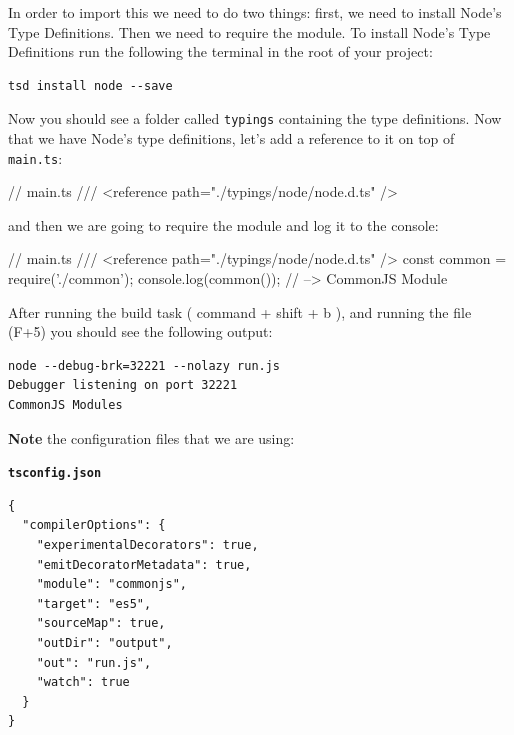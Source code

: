 \documentclass[12pt,]{article}
\newenvironment{Shaded}{}{}
\newcommand{\DataTypeTok}[1]{{#1}}
\newcommand{\CommentTok}[1]{\textcolor[rgb]{0.00,0.50,0.00}{{#1}}}
\newcommand{\FunctionTok}[1]{{#1}}
\newcommand{\NormalTok}[1]{{#1}}
\begin{document}
In order to import this we need to do two things: first, we need to
install Node's Type Definitions. Then we need to require the module. To
install Node's Type Definitions run the following the terminal in the
root of your project:

\begin{verbatim}
tsd install node --save
\end{verbatim}

Now you should see a folder called \texttt{typings} containing the type
definitions. Now that we have Node's type definitions, let's add a
reference to it on top of \texttt{main.ts}:

\begin{Shaded}
\begin{Highlighting}[numbers=left,,]
\CommentTok{// main.ts}
\CommentTok{/// <reference path="./typings/node/node.d.ts" />}
\end{Highlighting}
\end{Shaded}

and then we are going to require the module and log it to the console:

\begin{Shaded}
\begin{Highlighting}[numbers=left,,]
\CommentTok{// main.ts}
\CommentTok{/// <reference path="./typings/node/node.d.ts" />}
\DataTypeTok{const} \NormalTok{common = }\FunctionTok{require}\NormalTok{('./common');}
\NormalTok{console.}\FunctionTok{log}\NormalTok{(}\FunctionTok{common}\NormalTok{()); }\CommentTok{// --> CommonJS Module}
\end{Highlighting}
\end{Shaded}

After running the build task ( command + shift + b ), and running the
file (F+5) you should see the following output:

\begin{verbatim}
node --debug-brk=32221 --nolazy run.js 
Debugger listening on port 32221
CommonJS Modules
\end{verbatim}

\textbf{Note} the configuration files that we are using:

\textbf{\texttt{tsconfig.json}}

\begin{verbatim}
{
  "compilerOptions": {
    "experimentalDecorators": true,
    "emitDecoratorMetadata": true,
    "module": "commonjs",
    "target": "es5",
    "sourceMap": true,
    "outDir": "output",
    "out": "run.js",
    "watch": true
  }
}
\end{verbatim}
\end{document}
